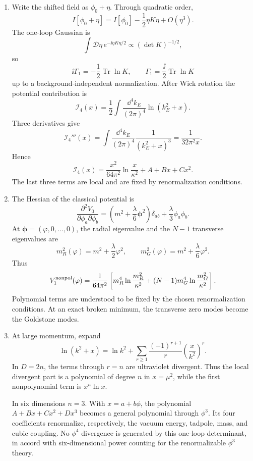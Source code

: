\begin{enumerate}
  \begin{enumerate}
    \item[(a)]
    Write the shifted field as \(\phi_0+\eta\).  Through quadratic order,
    \[
      I[\phi_0+\eta]
        =I[\phi_0]-\frac12\eta K\eta+O(\eta^3).
    \]
    The one-loop Gaussian is
    \[
      \int\mathcal D\eta\,
        e^{-\ii\eta K\eta/2}\propto(\det K)^{-1/2},
    \]
    so
    \[
      \ii\Gamma_1=-\frac12\operatorname{Tr}\ln K,
      \qquad
      \Gamma_1=\frac{\ii}{2}\operatorname{Tr}\ln K
    \]
    up to a background-independent normalization.  After Wick rotation the
    potential contribution is
    \[
      \mathcal I_4(x)
        =\frac12\int\frac{\dd^4k_E}{(2\pi)^4}\ln(k_E^2+x).
    \]
    Three derivatives give
    \[
      \mathcal I_4'''(x)
        =\int\frac{\dd^4k_E}{(2\pi)^4}\frac1{(k_E^2+x)^3}
        =\frac1{32\pi^2x}.
    \]
    Hence
    \[
      \mathcal I_4(x)
        =\frac{x^2}{64\pi^2}\ln\frac{x}{\kappa^2}
         +A+Bx+Cx^2.
    \]
    The last three terms are local and are fixed by renormalization
    conditions.
    \item[(b)]
    The Hessian of the classical potential is
    \[
      \frac{\partial^2V_0}{\partial\phi_a\partial\phi_b}
        =\left(m^2+\frac{\lambda}{6}\boldsymbol\phi^2\right)\delta_{ab}
         +\frac{\lambda}{3}\phi_a\phi_b.
    \]
    At \(\boldsymbol\phi=(\varphi,0,\ldots,0)\), the radial eigenvalue and
    the \(N-1\) transverse eigenvalues are
    \[
      m_R^2(\varphi)=m^2+\frac{\lambda}{2}\varphi^2,
      \qquad
      m_G^2(\varphi)=m^2+\frac{\lambda}{6}\varphi^2.
    \]
    Thus
    \[
      V_1^{\rm nonpol}(\varphi)
        =\frac1{64\pi^2}\left[
          m_R^4\ln\frac{m_R^2}{\kappa^2}
          +(N-1)m_G^4\ln\frac{m_G^2}{\kappa^2}\right].
    \]
    Polynomial terms are understood to be fixed by the chosen
    renormalization conditions.  At an exact broken minimum, the transverse
    zero modes become the Goldstone modes.
    \item[(c)]
    At large momentum, expand
    \[
      \ln(k^2+x)
        =\ln k^2+\sum_{r\ge1}\frac{(-1)^{r+1}}r
          \left(\frac{x}{k^2}\right)^r.
    \]
    In \(D=2n\), the terms through \(r=n\) are ultraviolet divergent.
    Thus the local divergent part is a polynomial of degree \(n\) in
    \(x=\mu^2\), while the first nonpolynomial term is
    \(x^n\ln x\).

    In six dimensions \(n=3\).  With \(x=a+b\phi\), the polynomial
    \(A+Bx+Cx^2+Dx^3\) becomes a general polynomial through \(\phi^3\).
    Its four coefficients renormalize, respectively, the vacuum energy,
    tadpole, mass, and cubic coupling.  No \(\phi^4\) divergence is generated
    by this one-loop determinant, in accord with six-dimensional power
    counting for the renormalizable \(\phi^3\) theory.
  \end{enumerate}


\end{enumerate}
